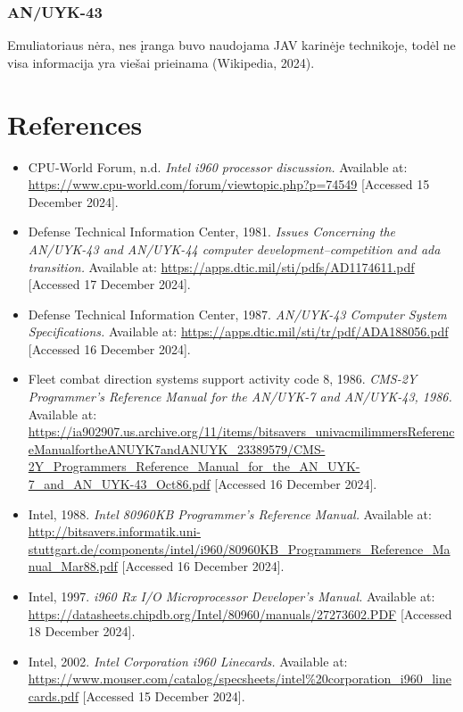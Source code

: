 \documentclass{article}
\begin{document}
\subsubsection{AN/UYK-43}
Emuliatoriaus nėra, nes įranga buvo naudojama JAV karinėje technikoje, todėl ne visa informacija yra viešai prieinama (Wikipedia, 2024).
\section{References}
\begin{itemize}

\item CPU-World Forum, n.d. \textit{Intel i960 processor discussion.} Available at: \url{https://www.cpu-world.com/forum/viewtopic.php?p=74549} [Accessed 15 December 2024].

\item Defense Technical Information Center, 1981. \textit{Issues Concerning the AN/UYK-43 and AN/UYK-44 computer development--competition and ada transition.} Available at: \url{https://apps.dtic.mil/sti/pdfs/AD1174611.pdf} [Accessed 17 December 2024].

\item Defense Technical Information Center, 1987. \textit{AN/UYK-43 Computer System Specifications.} Available at: \url{https://apps.dtic.mil/sti/tr/pdf/ADA188056.pdf} [Accessed 16 December 2024].

\item Fleet combat direction systems support activity code 8, 1986. \textit{CMS-2Y Programmer's Reference Manual for the AN/UYK-7 and AN/UYK-43, 1986.} Available at: \url{https://ia902907.us.archive.org/11/items/bitsavers_univacmilimmersReferenceManualfortheANUYK7andANUYK_23389579/CMS-2Y_Programmers_Reference_Manual_for_the_AN_UYK-7_and_AN_UYK-43_Oct86.pdf} [Accessed 16 December 2024].

\item Intel, 1988. \textit{Intel 80960KB Programmer's Reference Manual.} Available at: \url{http://bitsavers.informatik.uni-stuttgart.de/components/intel/i960/80960KB_Programmers_Reference_Manual_Mar88.pdf} [Accessed 16 December 2024].

\item Intel, 1997. \textit{i960 Rx I/O Microprocessor Developer’s Manual.} Available at: \url{https://datasheets.chipdb.org/Intel/80960/manuals/27273602.PDF} [Accessed 18 December 2024].

\item Intel, 2002. \textit{Intel Corporation i960 Linecards.} Available at: \url{https://www.mouser.com/catalog/specsheets/intel%20corporation_i960_linecards.pdf} [Accessed 15 December 2024].


\end{itemize}
\end{document}
